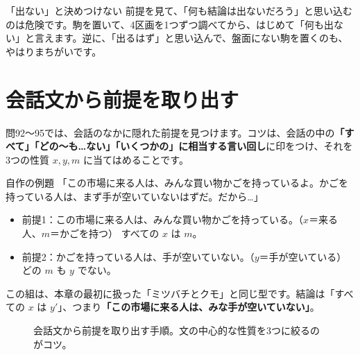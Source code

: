 \documentclass[a4paper,11pt,openany]{ltjsbook}
\begin{document}
\begin{pointbox}{「出ない」と決めつけない}
前提を見て、「何も結論は出ないだろう」と思い込むのは危険です。駒を置いて、4区画を1つずつ調べてから、はじめて「何も出ない」と言えます。逆に、「出るはず」と思い込んで、盤面にない駒を置くのも、やはりまちがいです。
\end{pointbox}

\section{会話文から前提を取り出す}

問92〜95では、会話のなかに隠れた前提を見つけます。コツは、会話の中の\textbf{「すべて」「どの～も…ない」「いくつかの」に相当する言い回し}に印をつけ、それを3つの性質 $x,y,m$ に当てはめることです。

\begin{examplebox}{自作の例題}
「この市場に来る人は、みんな買い物かごを持っているよ。かごを持っている人は、まず手が空いていないはずだ。だから…」
\end{examplebox}

\begin{itemize}[leftmargin=1.5em]
\item 前提1：この市場に来る人は、みんな買い物かごを持っている。（$x$＝来る人、$m$＝かごを持つ）\; すべての $x$ は $m$。
\item 前提2：かごを持っている人は、手が空いていない。（$y$＝手が空いている）\; どの $m$ も $y$ でない。
\end{itemize}

この組は、本章の最初に扱った「ミツバチとクモ」と同じ型です。結論は「すべての $x$ は $y'$」、つまり\textbf{「この市場に来る人は、みな手が空いていない」}。

\begin{figure}[htbp]
\centering
{}
\caption{会話文から前提を取り出す手順。文の中心的な性質を3つに絞るのがコツ。}
\end{figure}
\end{document}
